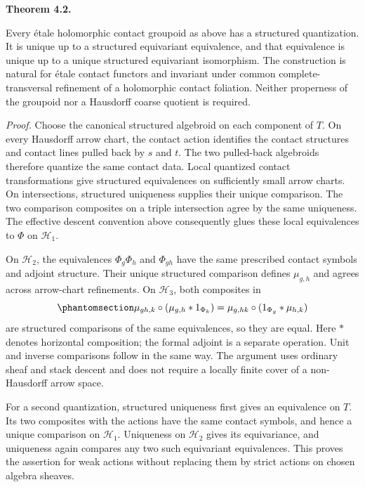 \documentclass[
  english,
  11pt,
  reqno]{amsart}
\makeatletter
\newcommand{\pandocstatementheading}[1]{%
  \par\addpenalty{\@beginparpenalty}%
  \addvspace{.5\baselineskip plus .2\baselineskip minus .2\baselineskip}%
  {\normalfont\bfseries #1\par}%
  \nobreak\@afterindenttrue\@afterheading
}
\makeatother
\begin{document}
\pandocstatementheading{\protect{}\label{thm:contact-groupoid-structured-quantization}Theorem 4.2.}

Every étale holomorphic contact groupoid as above has a structured
quantization. It is unique up to a structured equivariant equivalence,
and that equivalence is unique up to a unique structured equivariant
isomorphism. The construction is natural for étale contact functors and
invariant under common complete-transversal refinement of a holomorphic
contact foliation. Neither properness of the groupoid nor a Hausdorff
coarse quotient is required.

\emph{Proof.} Choose the canonical structured algebroid on each
component of \(T\). On every Hausdorff arrow chart, the contact action
identifies the contact structures and contact lines pulled back by \(s\)
and \(t\). The two pulled-back algebroids therefore quantize the same
contact data. Local quantized contact transformations give structured
equivalences on sufficiently small arrow charts. On intersections,
structured uniqueness supplies their unique comparison. The two
comparison composites on a triple intersection agree by the same
uniqueness. The effective descent convention above consequently glues
these local equivalences to \(\Phi\) on \(\mathcal H_1\).

On \(\mathcal H_2\), the equivalences \(\Phi_g\Phi_h\) and \(\Phi_{gh}\)
have the same prescribed contact symbols and adjoint structure. Their
unique structured comparison defines \(\mu_{g,h}\) and agrees across
arrow-chart refinements. On \(\mathcal H_3\), both composites in
\begin{equation}\protect\phantomsection\label{eq:contact-groupoid-operator-associativity}{
\mu_{gh,k}\circ(\mu_{g,h}*1_{\Phi_k})
=\mu_{g,hk}\circ(1_{\Phi_g}*\mu_{h,k})
}\end{equation} are structured comparisons of the same equivalences, so
they are equal. Here \(*\) denotes horizontal composition; the formal
adjoint is a separate operation. Unit and inverse comparisons follow in
the same way. The argument uses ordinary sheaf and stack descent and
does not require a locally finite cover of a non-Hausdorff arrow space.

For a second quantization, structured uniqueness first gives an
equivalence on \(T\). Its two composites with the actions have the same
contact symbols, and hence a unique comparison on \(\mathcal H_1\).
Uniqueness on \(\mathcal H_2\) gives its equivariance, and uniqueness
again compares any two such equivariant equivalences. This proves the
assertion for weak actions without replacing them by strict actions on
chosen algebra sheaves.
\end{document}
